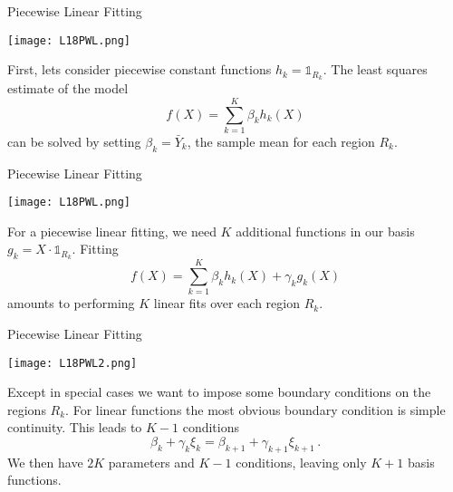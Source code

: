 \documentclass[10pt, table, dvipsnames,xcdraw,handout]{beamer}
\begin{document}
\begin{frame}[fragile]{Piecewise Linear Fitting}
  \begin{minipage}[t][0.5\textheight][t]{\textwidth}
	\centering \texttt{[image: L18PWL.png]} 
  \end{minipage}
  \vfill
\begin{minipage}[t][0.5\textheight][t]{\textwidth}
First, lets consider piecewise constant functions $h_k = \mathds{1}_{R_k}$. \pause The least squares estimate of the model
$$
f(X) = \sum_{k=1}^K \beta_k h_k(X)
$$
can be solved by setting $\beta_k = \bar{Y}_k$, the sample mean for each region $R_k$.\pause
\end{minipage}
\end{frame}






\begin{frame}[fragile]{Piecewise Linear Fitting}
  \begin{minipage}[t][0.5\textheight][t]{\textwidth}
	\centering \texttt{[image: L18PWL.png]} 
  \end{minipage}
  \vfill
\begin{minipage}[t][0.5\textheight][t]{\textwidth}
For a piecewise linear fitting, we need $K$ additional functions in our basis $g_k = X\cdot \mathds{1}_{R_k}$. \pause Fitting
$$
f(X) = \sum_{k=1}^K \beta_k h_k(X) + \gamma_k g_k(X)
$$ 
amounts to performing $K$ linear fits over each region $R_k$. 
\end{minipage}
\end{frame}



\begin{frame}[fragile]{Piecewise Linear Fitting}
  \begin{minipage}[t][0.5\textheight][t]{\textwidth}
	\centering \texttt{[image: L18PWL2.png]} 
  \end{minipage}
  \vfill
\begin{minipage}[t][0.5\textheight][t]{\textwidth}
Except in special cases we want to impose some boundary conditions on the regions $R_k$. For linear functions the most obvious boundary condition is simple continuity. \pause This leads to $K-1$ conditions
$$
\beta_k + \gamma_k\xi_k = \beta_{k+1} + \gamma_{k+1}\xi_{k+1}\,.
$$\pause
We then have $2K$ parameters and $K-1$ conditions, leaving only $K+1$ basis functions. 
\end{minipage}
\end{frame}
\end{document}
